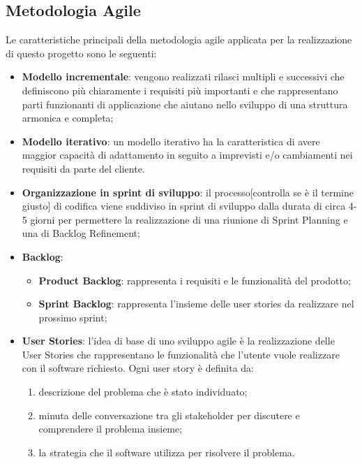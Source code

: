\subsection{Metodologia Agile}
Le caratteristiche principali della metodologia agile applicata per la realizzazione di questo progetto sono le seguenti:
\begin{itemize}
	\item \textbf{Modello incrementale}: vengono realizzati rilasci multipli e successivi che definiscono più chiaramente i requisiti più importanti e che rappresentano parti funzionanti di applicazione che aiutano nello sviluppo di una struttura armonica e completa;
	
	\item \textbf{Modello iterativo}: un modello iterativo ha la caratteristica di avere maggior capacità di adattamento in seguito a imprevisti e/o cambiamenti nei requisiti da parte del cliente.
	
	\item \textbf{Organizzazione in sprint di sviluppo}: il processo[controlla se è il termine giusto] di codifica viene suddiviso in sprint di sviluppo dalla durata di circa 4-5 giorni per permettere la realizzazione di una riunione di Sprint Planning e una di Backlog Refinement;
	
	\item \textbf{Backlog}: 
		\begin{itemize}
			\item \textbf{Product Backlog}: rappresenta i requisiti e le funzionalità del prodotto;
			\item \textbf{Sprint Backlog}: rappresenta l'insieme delle user stories da realizzare nel prossimo sprint;
		\end{itemize}
	
	\item \textbf{User Stories}: l'idea di base di uno sviluppo agile è la realizzazione delle User Stories che rappresentano le funzionalità che l'utente vuole realizzare con il software richiesto. Ogni user story è definita da:
		\begin{enumerate}
			\item descrizione del problema che è stato individuato;
			\item minuta delle conversazione tra gli stakeholder per discutere e comprendere il problema insieme;
			\item la strategia che il software utilizza per risolvere il problema.
		\end{enumerate}
	

\end{itemize}
